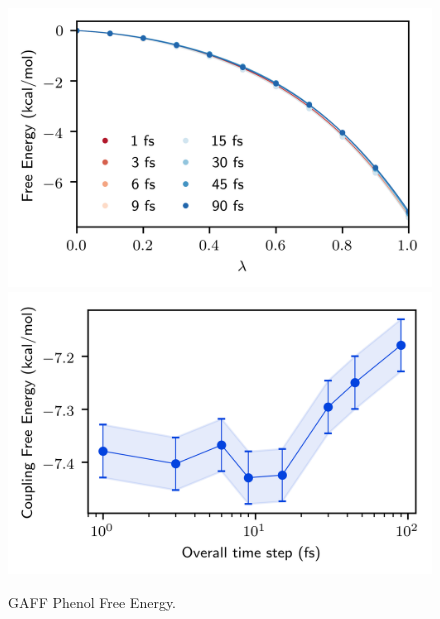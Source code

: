 \documentclass[
aip,
jcp,
reprint,
]{revtex4-1}
\begin{document}
\begin{figure}
	\centering
	\includegraphics{gaff_phenol_coul_free_energy_profiles}
	\includegraphics{gaff_phenol_coul_free_energies}
	\caption{GAFF Phenol Free Energy.}
	\label{fig:phenol coulomb free energy}
\end{figure}
\end{document}
